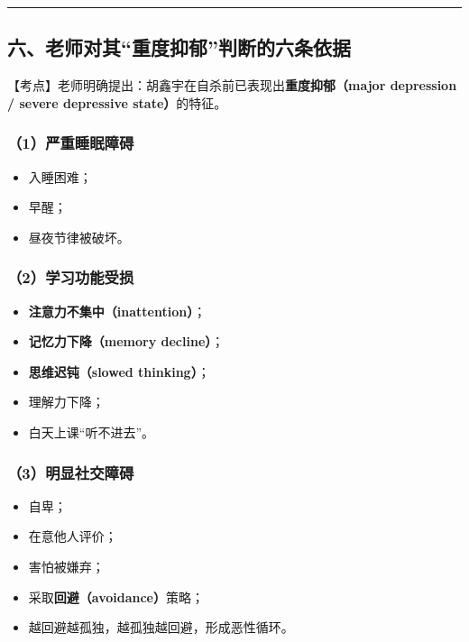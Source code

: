 \documentclass[
  chinese,
  9pt,
  a4paper,
]{ctexart}
\providecommand{\tightlist}{%
  \setlength{\itemsep}{0pt}\setlength{\parskip}{0pt}}
\begin{document}
\begin{center}\rule{0.5\linewidth}{0.5pt}\end{center}

\subsection{六、老师对其``重度抑郁''判断的六条依据}\label{ux516dux8001ux5e08ux5bf9ux5176ux91cdux5ea6ux6291ux90c1ux5224ux65adux7684ux516dux6761ux4f9dux636e}

【考点】老师明确提出：胡鑫宇在自杀前已表现出\textbf{重度抑郁（major
depression / severe depressive state）}的特征。

\subsubsection{（1）严重睡眠障碍}\label{ux4e25ux91cdux7761ux7720ux969cux788d}

\begin{itemize}
\tightlist
\item
  入睡困难；
\item
  早醒；
\item
  昼夜节律被破坏。
\end{itemize}

\subsubsection{（2）学习功能受损}\label{ux5b66ux4e60ux529fux80fdux53d7ux635f}

\begin{itemize}
\tightlist
\item
  \textbf{注意力不集中（inattention）}；
\item
  \textbf{记忆力下降（memory decline）}；
\item
  \textbf{思维迟钝（slowed thinking）}；
\item
  理解力下降；
\item
  白天上课``听不进去''。
\end{itemize}

\subsubsection{（3）明显社交障碍}\label{ux660eux663eux793eux4ea4ux969cux788d}

\begin{itemize}
\tightlist
\item
  自卑；
\item
  在意他人评价；
\item
  害怕被嫌弃；
\item
  采取\textbf{回避（avoidance）}策略；
\item
  越回避越孤独，越孤独越回避，形成恶性循环。
\end{itemize}
\end{document}
